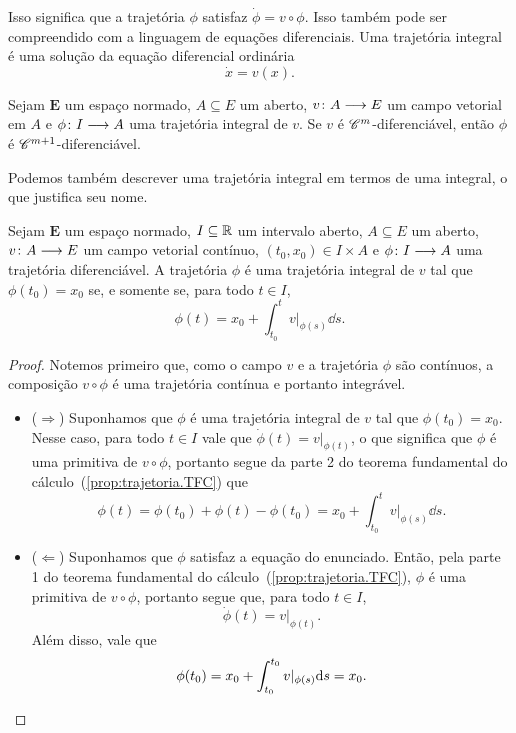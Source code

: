 Isso significa que a trajetória $\phi$ satisfaz $\dot \phi = v \circ \phi$. Isso também pode ser compreendido com a linguagem de equações diferenciais. Uma trajetória integral é uma solução da equação diferencial ordinária
	\begin{equation*}
	\dot x = v(x).
	\end{equation*}

\begin{exercise}
Sejam $\bm E$ um espaço normado, $A \subseteq E$ um aberto, $v\colon \allowbreak A \longrightarrow E$ um campo vetorial em $A$ e $\phi\colon \allowbreak I \longrightarrow A$ uma trajetória integral de $v$. Se $v$ é $\mathscr{C}^m$-diferenciável, então $\phi$ é $\mathscr{C}^{m+1}$-diferenciável.
\end{exercise}

Podemos também descrever uma trajetória integral em termos de uma integral, o que justifica seu nome.

\begin{proposition}
\label{prop:equivalencia.trajetoria.integral}
Sejam $\bm E$ um espaço normado, $I \subseteq \mathbb{R}$ um intervalo aberto, $A \subseteq E$ um aberto, $v\colon \allowbreak A \longrightarrow E$ um campo vetorial contínuo, $(t_0,x_0) \in I \times A$ e $\phi\colon \allowbreak I \longrightarrow A$ uma trajetória diferenciável. A trajetória $\phi$ é uma trajetória integral de $v$ tal que $\phi(t_0) = x_0$ se, e somente se, para todo $t \in I$,
	\begin{equation*}
	\phi(t) = x_0 + \int_{t_0}^{t} v|_{\phi(s)} \dd s.
	\end{equation*}
\end{proposition}
\begin{proof}
Notemos primeiro que, como o campo $v$ e a trajetória $\phi$ são contínuos, a composição $v \circ \phi$ é uma trajetória contínua e portanto integrável.
	\begin{itemize}
	\item ($\Rightarrow$) Suponhamos que $\phi$ é uma trajetória integral de $v$ tal que $\phi(t_0) = x_0$. Nesse caso, para todo $t \in I$ vale que $\dot \phi(t) = v|_{\phi(t)}$, o que significa que $\phi$ é uma primitiva de $v \circ \phi$, portanto segue da parte 2 do teorema fundamental do cálculo~(\ref{prop:trajetoria.TFC}) que
		\begin{equation*}
		\phi(t) = \phi(t_0) + \phi(t) - \phi(t_0) %
		= x_0 + \int_{t_0}^{t} v|_{\phi(s)} \dd s.
		\end{equation*}

	\item ($\Leftarrow$) Suponhamos que $\phi$ satisfaz a equação do enunciado. Então, pela parte 1 do teorema fundamental do cálculo~(\ref{prop:trajetoria.TFC}), $\phi$ é uma primitiva de $v \circ \phi$, portanto segue que, para todo $t \in I$,
		\begin{equation*}
		\dot \phi(t) = v|_{\phi(t)}.
		\end{equation*}
	Além disso, vale que
		\begin{equation*}
		\phi(t_0) = x_0 + \int_{t_0}^{t_0} v|_{\phi(s)} \mathrm{d} s = x_0.
		\qedhere
		\end{equation*}
	\end{itemize}
\end{proof}

